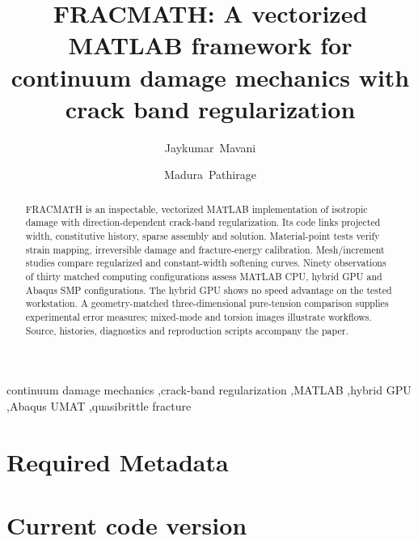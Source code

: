 \documentclass[preprint,11pt,a4paper]{elsarticle}
\begin{document}
\begin{frontmatter}

\title{FRACMATH: A vectorized MATLAB framework for continuum damage
mechanics with crack band regularization}

\author[unm]{Jaykumar~Mavani}
\author[unm]{Madura~Pathirage}
\address[unm]{Gerald May Department of Civil, Construction, and Environmental Engineering,
University of New Mexico, Albuquerque, NM, USA}

\begin{abstract}
FRACMATH is an inspectable, vectorized MATLAB implementation of isotropic
damage with direction-dependent crack-band regularization. Its code links
projected width, constitutive history, sparse assembly and solution.
Material-point tests verify strain mapping, irreversible damage and
fracture-energy calibration. Mesh/increment studies compare regularized
and constant-width softening curves. Ninety observations of thirty matched computing configurations assess
MATLAB CPU, hybrid GPU and Abaqus SMP configurations. The hybrid GPU shows
no speed advantage on the tested workstation. A geometry-matched
three-dimensional pure-tension comparison supplies experimental error
measures; mixed-mode and torsion images illustrate workflows. Source,
histories, diagnostics and reproduction scripts accompany the paper.
\end{abstract}

\begin{keyword}
continuum damage mechanics \sep crack-band regularization \sep MATLAB \sep hybrid GPU \sep Abaqus UMAT \sep quasibrittle fracture
\end{keyword}

\end{frontmatter}


\section*{Required Metadata}
\label{sec:metadata}

\section*{Current code version}
\label{sec:current-code-version}
\end{document}

